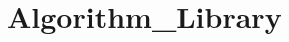 \chapter{Algorithm\+\_\+\+Library}
\hypertarget{md__r_e_a_d_m_e}{}\label{md__r_e_a_d_m_e}
\label{md__r_e_a_d_m_e_autotoc_md0}%
%
